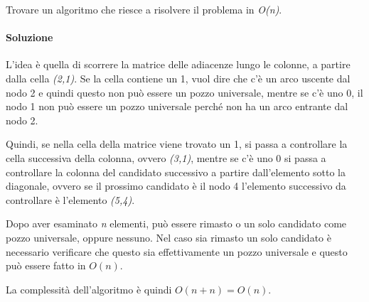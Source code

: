 Trovare un algoritmo che riesce a risolvere il problema in \emph{O(n)}.

\paragraph{Soluzione} L'idea è quella di scorrere la matrice delle adiacenze lungo le colonne, a partire dalla cella \textit{(2,1)}. Se la cella contiene un 1, vuol dire che c'è un arco uscente dal nodo 2 e quindi questo non può essere un pozzo universale, mentre se c'è uno 0, il nodo 1 non può essere un pozzo universale perché non ha un arco entrante dal nodo 2.

Quindi, se nella cella della matrice viene trovato un 1, si passa a controllare la cella successiva della colonna, ovvero \textit{(3,1)}, mentre se c'è uno 0 si passa a controllare la colonna del candidato successivo a partire dall'elemento sotto la diagonale, ovvero se il prossimo candidato è il nodo 4 l'elemento successivo da controllare è l'elemento \textit{(5,4)}.

Dopo aver esaminato \textit{n} elementi, può essere rimasto o un solo candidato come pozzo universale, oppure nessuno.
Nel caso sia rimasto un solo candidato è necessario verificare che questo sia effettivamente un pozzo universale e questo può essere fatto in $ O(n) $.

La complessità dell'algoritmo è quindi $ O(n + n) = O(n) $.